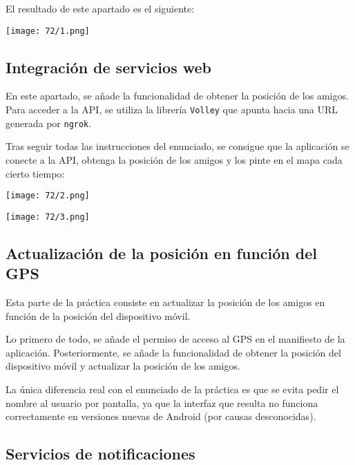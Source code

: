 El resultado de este apartado es el siguiente:

\begin{minipage}{\linewidth}
	\centering
	\texttt{[image: 72/1.png]}
	\label{fig:72/1}
\end{minipage}

\subsection{Integración de servicios web}
En este apartado, se añade la funcionalidad de obtener la posición de los amigos. Para acceder
a la API, se utiliza la librería \Verb#Volley# que apunta hacia una URL generada por \Verb#ngrok#.

Tras seguir todas las instrucciones del enunciado, se consigue que la aplicación se conecte a la API,
obtenga la posición de los amigos y los pinte en el mapa cada cierto tiempo:

\begin{minipage}{\linewidth}
	\centering
	\texttt{[image: 72/2.png]}
	\label{fig:72/2}
\end{minipage}

\begin{minipage}{\linewidth}
	\centering
	\texttt{[image: 72/3.png]}
	\label{fig:72/3}
\end{minipage}

\subsection{Actualización de la posición en función del GPS}
Esta parte de la práctica consiste en actualizar la posición de los amigos en función de la
posición del dispositivo móvil.

Lo primero de todo, se añade el permiso de acceso al GPS en el manifiesto de la aplicación.
Posteriormente, se añade la funcionalidad de obtener la posición del dispositivo móvil y
actualizar la posición de los amigos.

La única diferencia real con el enunciado de la práctica es que se evita pedir el nombre
al usuario por pantalla, ya que la interfaz que resulta no funciona correctamente en versiones
nuevas de Android (por causas desconocidas).

\subsection{Servicios de notificaciones}

